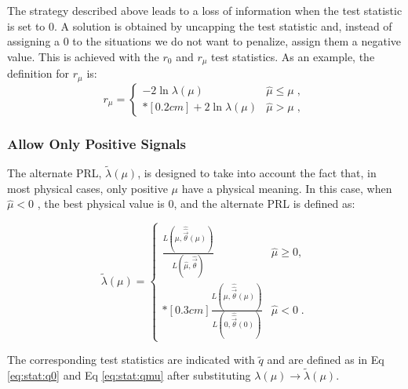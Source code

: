 The strategy described above leads to a loss of information when the test statistic is set to 0. A solution is obtained by uncapping the test statistic and, instead of assigning a 0 to the situations we do not want to penalize, assign them a negative value. This is achieved with the $r_0$ and $r_\mu$ test statistics. As an example, the definition for $r_\mu$ is:
\begin{equation}
\label{eq:rmu}
r_{\mu} =
\left\{ \! \! \begin{array}{ll}
               - 2 \ln \lambda(\mu)  & \hat{\mu} \le \mu  \;, \\*[0.2 cm]
               + 2 \ln \lambda(\mu)  & \hat{\mu} > \mu  \;,
              \end{array}
       \right.
\end{equation}

 
\subsubsection*{Allow Only Positive Signals}

The alternate PRL, $\tilde{\lambda}({\mu})$, is designed to take into account the fact that, in most physical cases, only positive $\mu$ have a physical meaning. In this case, when $\hat{\mu} < 0$ , the best physical value is 0, and the alternate PRL is defined as: 

\begin{equation}
\label{eq:stat:lik:alpexcl}
\tilde{\lambda}({\mu}) =
\left\{ \! \! \begin{array}{ll}
               \frac{ L(\mu,
               \hat{\hat{\vec{\theta}}}(\mu)) }
               {L(\hat{\mu}, \hat{\vec{\theta}}) }
                 & \hat{\mu} \ge 0 , \\*[0.3 cm]
                \frac{ L(\mu,
               \hat{\hat{\vec{\theta}}}(\mu)) }
               {L(0, \hat{\hat{\vec{\theta}}}(0)) }
 & \hat{\mu} < 0 \;.
              \end{array}
       \right.
\end{equation}

\noindent The corresponding test statistics are indicated with $\tilde{q}$ and are defined as in Eq \ref{eq:stat:q0} and Eq \ref{eq:stat:qmu} after substituting $\lambda({\mu}) \rightarrow \tilde{\lambda}({\mu})$.

\iffalse
\begin{equation}
\label{eq:stat:q:excl}
\qmu = - 2 \ln \tilde{\lambda}(\mu) =
\left\{ \! \! \begin{array}{ll}
               - 2 \ln \frac{L(\mu, \hat{\hat{\vec{\theta}}}(\mu))}
                {L(0, \hat{\hat{\theta}}(0))}
                & \quad \hat{\mu} < 0  \;, \\*[0.2 cm]
               -2 \ln \frac{L(\mu, \hat{\hat{\vec{\theta}}}(\mu))}
                {L(\hat{\mu}, \hat{\vec{\theta}})}
&  \quad \hat{\mu} \ge 0  \;.
              \end{array}
       \right.
\end{equation}
\fi

